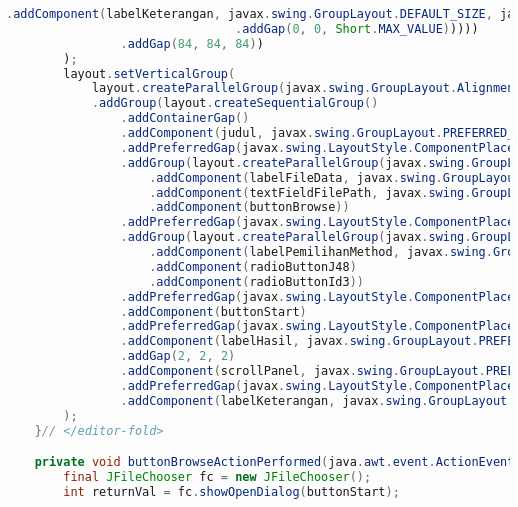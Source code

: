 \begin{lstlisting}[language=Java,basicstyle=\tiny,caption=View.java]
                                    .addComponent(labelKeterangan, javax.swing.GroupLayout.DEFAULT_SIZE, javax.swing.GroupLayout.DEFAULT_SIZE, Short.MAX_VALUE))
                                .addGap(0, 0, Short.MAX_VALUE)))))
                .addGap(84, 84, 84))
        );
        layout.setVerticalGroup(
            layout.createParallelGroup(javax.swing.GroupLayout.Alignment.LEADING)
            .addGroup(layout.createSequentialGroup()
                .addContainerGap()
                .addComponent(judul, javax.swing.GroupLayout.PREFERRED_SIZE, 31, javax.swing.GroupLayout.PREFERRED_SIZE)
                .addPreferredGap(javax.swing.LayoutStyle.ComponentPlacement.RELATED)
                .addGroup(layout.createParallelGroup(javax.swing.GroupLayout.Alignment.BASELINE)
                    .addComponent(labelFileData, javax.swing.GroupLayout.PREFERRED_SIZE, 26, javax.swing.GroupLayout.PREFERRED_SIZE)
                    .addComponent(textFieldFilePath, javax.swing.GroupLayout.PREFERRED_SIZE, javax.swing.GroupLayout.DEFAULT_SIZE, javax.swing.GroupLayout.PREFERRED_SIZE)
                    .addComponent(buttonBrowse))
                .addPreferredGap(javax.swing.LayoutStyle.ComponentPlacement.RELATED)
                .addGroup(layout.createParallelGroup(javax.swing.GroupLayout.Alignment.BASELINE)
                    .addComponent(labelPemilihanMethod, javax.swing.GroupLayout.PREFERRED_SIZE, 26, javax.swing.GroupLayout.PREFERRED_SIZE)
                    .addComponent(radioButtonJ48)
                    .addComponent(radioButtonId3))
                .addPreferredGap(javax.swing.LayoutStyle.ComponentPlacement.RELATED)
                .addComponent(buttonStart)
                .addPreferredGap(javax.swing.LayoutStyle.ComponentPlacement.RELATED)
                .addComponent(labelHasil, javax.swing.GroupLayout.PREFERRED_SIZE, 26, javax.swing.GroupLayout.PREFERRED_SIZE)
                .addGap(2, 2, 2)
                .addComponent(scrollPanel, javax.swing.GroupLayout.PREFERRED_SIZE, 251, javax.swing.GroupLayout.PREFERRED_SIZE)
                .addPreferredGap(javax.swing.LayoutStyle.ComponentPlacement.RELATED, 10, Short.MAX_VALUE)
                .addComponent(labelKeterangan, javax.swing.GroupLayout.PREFERRED_SIZE, 26, javax.swing.GroupLayout.PREFERRED_SIZE))
        );
    }// </editor-fold>                        

    private void buttonBrowseActionPerformed(java.awt.event.ActionEvent evt) {                                             
        final JFileChooser fc = new JFileChooser();
        int returnVal = fc.showOpenDialog(buttonStart);


\end{lstlisting}
